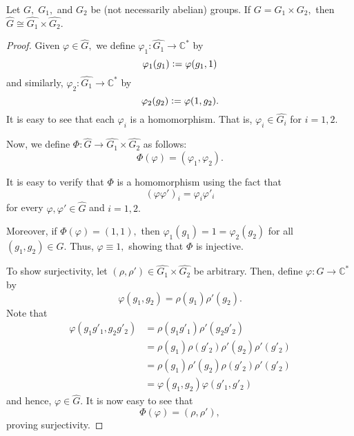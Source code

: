 \begin{prop}
	Let $G,\;G_1,$ and $G_2$ be (not necessarily abelian) groups. If $G = G_1 \times G_2,$ then $\widehat{G} \cong \widehat{G_1} \times \widehat{G_2}.$ 
\end{prop}
\begin{proof} 
	Given $\varphi \in \widehat{G},$ we define $\varphi_1 : \widehat{G_1} \to \mathbb{C}^*$ by
	\begin{equation*} 
		\varphi_1(g_1) \vcentcolon= \varphi(g_1, 1)
	\end{equation*}
	and similarly, $\varphi_2 : \widehat{G_1} \to \mathbb{C}^*$ by
	\begin{equation*} 
		\varphi_2(g_2) \vcentcolon= \varphi(1, g_2).
	\end{equation*}
	It is easy to see that each $\varphi_i$ is a homomorphism. That is, $\varphi_i \in \widehat{G_i}$ for $i = 1, 2.$ 

	Now, we define $\Phi:\widehat{G} \to \widehat{G_1} \times \widehat{G_2}$ as follows:	
	\begin{equation*} 
		\Phi(\varphi) = (\varphi_1, \varphi_2).
	\end{equation*}

	It is easy to verify that $\Phi$ is a homomorphism using the fact that
	\begin{equation*} 
		(\varphi\varphi')_i = \varphi_i\varphi'_i
	\end{equation*}
	for every $\varphi, \varphi' \in \widehat{G}$ and $i = 1, 2.$

	Moreover, if $\Phi(\varphi) = (1, 1),$ then $\varphi_1(g_1) = 1 = \varphi_2(g_2)$ for all $(g_1, g_2) \in G.$ Thus, $\varphi \equiv 1,$ showing that $\Phi$ is injective.

	To show surjectivity, let $(\rho, \rho') \in \widehat{G_1} \times \widehat{G_2}$ be arbitrary. Then, define $\varphi:G \to \mathbb{C}^*$ by
	\begin{equation*} 
		\varphi(g_1, g_2) = \rho(g_1)\rho'(g_2).
	\end{equation*}
	Note that
	\begin{align*} 
		\varphi(g_1g'_1, g_2g'_2) &= \rho(g_1g'_1)\rho'(g_2g'_2)\\
		&= \rho(g_1)\rho(g'_2)\rho'(g_2)\rho'(g'_2)\\
		&= \rho(g_1)\rho'(g_2)\rho(g'_2)\rho'(g'_2)\\
		&= \varphi(g_1, g_2)\varphi(g'_1, g'_2)
	\end{align*}
	and hence, $\varphi \in \widehat{G}.$ It is now easy to see that
	\begin{equation*} 
		\Phi(\varphi) = (\rho, \rho'),
	\end{equation*}
	proving surjectivity.	
\end{proof}

